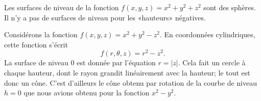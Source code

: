 \begin{example}
    Les surfaces de niveau de la fonction $f(x,y,z)=x^2+y^2+z^2$ sont des sphères. Il n'y a pas de surfaces de niveau pour les «hauteurs» négatives.
\end{example}

\begin{example}
    Considérons la fonction $f(x,y,z)=x^2+y^2-z^2$. En coordonnées cylindriques, cette fonction s'écrit
    \begin{equation}
        f(r,\theta,z)=r^2-z^2.
    \end{equation}
    La surface de niveau $0$ est donnée par l'équation $r=| z |$. Cela fait un cercle à chaque hauteur, dont le rayon grandit linéairement avec la hauteur; le tout est donc un cône. C'est d'ailleurs le cône obtenu par rotation de la courbe de niveau $h=0$ que nous avions obtenu pour la fonction $x^2-y^2$.


\end{example}
